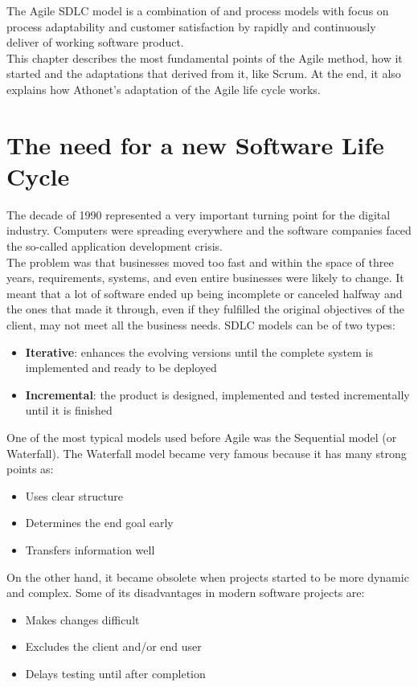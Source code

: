 The Agile SDLC model is a combination of  and  process models with focus on process adaptability and customer satisfaction by rapidly and continuously deliver of working software product\cite{sdlc_agile_model}.\\
This chapter describes the most fundamental points of the Agile method, how it started and the adaptations that derived from it, like Scrum.
At the end, it also explains how Athonet's adaptation of the Agile life cycle works.

\section{The need for a new Software Life Cycle}
	The decade of 1990 represented a very important turning point for the digital industry.
	Computers were spreading everywhere and the software companies faced the so-called application development crisis.\\
	The problem was that businesses moved too fast and within the space of three years, requirements, systems, and even entire businesses were likely to change. 
	It meant that a lot of software ended up being incomplete or canceled halfway and the ones that made it through, even if they fulfilled the original objectives of the client, may not meet all the business needs\cite{agility-beyond-history}.
	SDLC models can be of two types:
	\begin{itemize}
		\item \textbf{Iterative}: enhances the evolving versions until the complete system is implemented and ready to be deployed
		\item \textbf{Incremental}: the product is designed, implemented and tested incrementally until it is finished
	\end{itemize}
	One of the most typical models used before Agile was the Sequential model (or Waterfall).
	The Waterfall model became very famous because it has many strong points as:
	\begin{itemize}
		\item Uses clear structure
		\item Determines the end goal early
		\item Transfers information well
	\end{itemize}
	On the other hand, it became obsolete when projects started to be more dynamic and complex.
	Some of its disadvantages in modern software projects are:
	\begin{itemize}
		\item Makes changes difficult
		\item Excludes the client and/or end user
		\item Delays testing until after completion
	\end{itemize}
